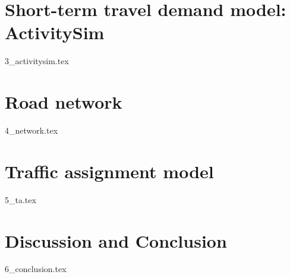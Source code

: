 \documentclass{report}
\begin{document}
\section{Short-term travel demand model: ActivitySim}
\label{sec:activitysim}
{3_activitysim.tex}

\section{Road network}
\label{sec:network}
{4_network.tex}

\section{Traffic assignment model}
\label{sec:ta}
{5_ta.tex}

\section{Discussion and Conclusion}
\label{sec:conclusion}
{6_conclusion.tex}

\clearpage
{}
\theendnotes

\clearpage
{}
\printbibliography[title=References]
\end{document}
